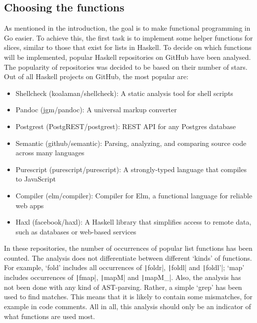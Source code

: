 \subsection{Choosing the functions}

As mentioned in the introduction, the goal is to make functional programming in Go easier.
To achieve this, the first task is to implement some helper functions for slices, similar to those that exist
for lists in Haskell. To decide on which functions will be implemented, popular
Haskell repositories on GitHub have been analysed. The popularity of repositories
was decided to be based on their number of stars. Out of all Haskell projects
on GitHub, the most popular are\autocite{github-popular-haskell}:

\begin{itemize}
    \item Shellcheck (koalaman/shellcheck\autocite{github-shellcheck}): A static analysis tool for shell scripts
    \item Pandoc (jgm/pandoc\autocite{github-pandoc}): A universal markup converter
    \item Postgrest (PostgREST/postgrest\autocite{github-postgrest}): REST API for any Postgres database
    \item Semantic (github/semantic\autocite{github-semantic}): Parsing, analyzing, and comparing source code across many languages
    \item Purescript (purescript/purescript\autocite{github-purescript}): A strongly-typed language that compiles to JavaScript
    \item Compiler (elm/compiler\autocite{github-elmcompiler}): Compiler for Elm, a functional language for reliable web apps
    \item Haxl (facebook/haxl\autocite{github-haxl}): A Haskell library that simplifies access to remote data, such as databases or web-based services
\end{itemize}

In these repositories, the number of occurrences of popular list functions has
been counted. The analysis does not differentiate between different `kinds' of
functions. For example, `fold' includes all occurrences of \texttt|foldr|,
\texttt|foldl| and \texttt|foldl'|; `map' includes
occurrences of \texttt|fmap|, \texttt|mapM| and
\texttt|mapM\_|.
Also, the analysis has not been done with any kind of AST-parsing.
Rather, a simple `grep' has been used to find matches. This means that it is
likely to contain some mismatches, for example in code comments. All in all,
this analysis should only be an indicator of what functions are used most.

